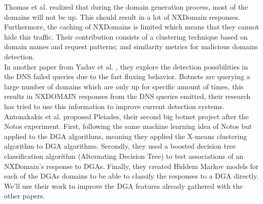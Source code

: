 Thomas et al. \cite{dga4} realized that during the domain generation process, most of the domains will not be up. This should result in a lot of NXDomain responses. Furthermore, the caching of NXDomains is limited which means that they cannot hide this traffic. Their contribution consists of a clustering technique based on domain names and request patterns; and similarity metrics for malicious domains detection.\\

In another paper from Yadav et al. \cite{dnsfailure}, they explore the detection possibilities in the DNS failed queries due to the fast fluxing behavior. Botnets are querying a large number of domains which are only up for specific amount of times, this results in NXDOMAIN responses from the DNS queries emitted, their research has tried to use this information to improve current detection systems.\\

Antonakakis et al. \cite{pleiades} proposed Pleiades, their second big botnet project after the Notos experiment. First, following the same machine learning idea of Notos but applied to the DGA algorithms, meaning they applied the X-means clustering algorithm to DGA algorithms. Secondly, they used a boosted decision tree classification algorithm (Alternating Decision Tree) to test associations of an NXDomain's response to  DGAs. Finally, they created Hiddem Markov models for each of the DGAs domains to be able to classify the responses to a DGA directly. We'll use their work to improve the DGA features already gathered with the other papers.


